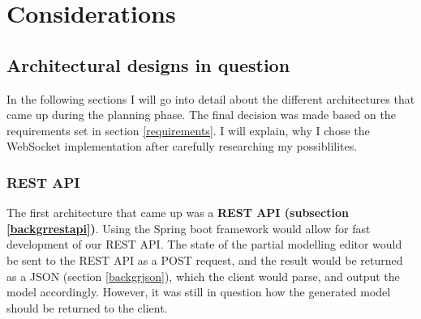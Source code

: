 \chapter{Considerations}\label{considerations}

\section{Architectural designs in question}
In the following sections I will go into detail about the different architectures that came up during
the planning phase. The final decision was made based on the requirements set in section \ref{requirements}.
I will explain, why I chose the WebSocket implementation after carefully researching
my possiblilites.

\subsection{REST API}\label{restconsiderations}
The first architecture that came up was a \textbf{REST API (subsection \ref{backgrrestapi})}. Using the Spring boot framework would allow for fast development
of our REST API. The state of the partial modelling editor would be sent to the REST API as a POST request, and the result
would be returned as a JSON (section \ref{backgrjson}), which the client would parse, and output the model accordingly. 
However, it was still in question
how the generated model should be returned to the client.
